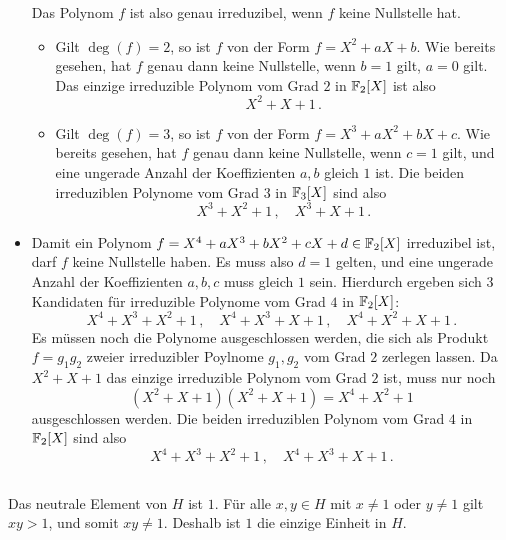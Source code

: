 \begin{itemize}
    Das Polynom $f$ ist also genau irreduzibel, wenn $f$ keine Nullstelle hat.
    
    \begin{itemize}
      \item
        Gilt $\deg(f) = 2$, so ist $f$ von der Form $f = X^2 + aX + b$.
        Wie bereits gesehen, hat $f$ genau dann keine Nullstelle, wenn $b = 1$ gilt, $a = 0$ gilt.
        Das einzige irreduzible Polynom vom Grad $2$ in $\mathbb{F}_2[X]$ ist also
        \[
          X^2 + X + 1 \,.
        \]
      \item
        Gilt $\deg(f) = 3$, so ist $f$ von der Form $f = X^3 + aX^2 + bX + c$.
        Wie bereits gesehen, hat $f$ genau dann keine Nullstelle, wenn $c = 1$ gilt, und eine ungerade Anzahl der Koeffizienten $a, b$ gleich $1$ ist.
        Die beiden irreduziblen Polynome vom Grad $3$ in $\mathbb{F}_3[X]$ sind also
        \[
          X^3 + X^2 + 1 \,,
          \quad
          X^3 + X + 1 \,.
        \]
    \end{itemize}
    
  \item
    Damit ein Polynom $f = X^4 + aX^3 + bX^2 + cX + d \in \mathbb{F}_2[X]$ irreduzibel ist, darf $f$ keine Nullstelle haben.
    Es muss also $d = 1$ gelten, und eine ungerade Anzahl der Koeffizienten $a, b, c$ muss gleich $1$ sein.
    Hierdurch ergeben sich $3$ Kandidaten für irreduzible Polynome vom Grad $4$ in $\mathbb{F}_2[X]$:
    \[
      X^4 + X^3 + X^2 + 1 \,,
      \quad
      X^4 + X^3 + X + 1 \,,
      \quad
      X^4 + X^2 + X + 1 \,.
    \]
    Es müssen noch die Polynome ausgeschlossen werden, die sich als Produkt $f = g_1 g_2$ zweier irreduzibler Poylnome $g_1, g_2$ vom Grad $2$ zerlegen lassen.
    Da $X^2 + X + 1$ das einzige irreduzible Polynom vom Grad $2$ ist, muss nur noch
    \[
        (X^2 + X + 1)(X^2 + X + 1)
      = X^4 + X^2 + 1
    \]
    ausgeschlossen werden.
    Die beiden irreduziblen Polynom vom Grad $4$ in $\mathbb{F}_2[X]$ sind also
    \[
      X^4 + X^3 + X^2 + 1 \,,
      \quad
      X^4 + X^3 + X + 1 \,.
    \]
\end{itemize}





\subsection{}

Das neutrale Element von $H$ ist $1$.
Für alle $x, y \in H$ mit $x \neq 1$ oder $y \neq 1$ gilt $xy > 1$, und somit $xy \neq 1$.
Deshalb ist $1$ die einzige Einheit in $H$.

